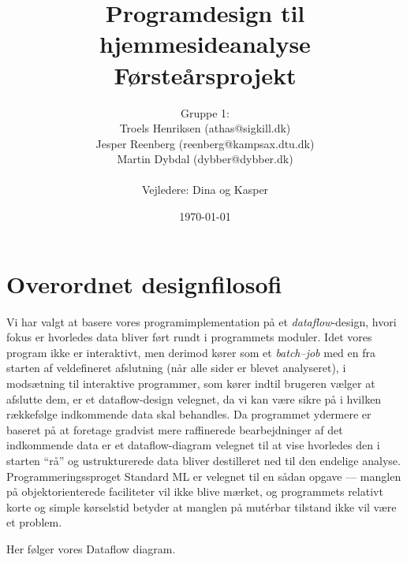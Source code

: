 \documentclass[a4paper,oneside,article, titlepage]{article}
\title{Programdesign til hjemmesideanalyse  \\
       \small{Førsteårsprojekt}}
\author
{
  Gruppe 1:\\
  Troels Henriksen (athas@sigkill.dk)\\
  Jesper Reenberg (reenberg@kampsax.dtu.dk)\\
  Martin Dybdal (dybber@dybber.dk)\\ \\
  Vejledere: Dina og Kasper
}
\date{\today}
\begin{document}
\maketitle
\tableofcontents
\newpage

\section{Overordnet designfilosofi}

Vi har valgt at basere vores programimplementation på et {\em
  dataflow}-design, hvori fokus er hvorledes data bliver ført rundt i
programmets moduler. Idet vores program ikke er interaktivt, men
derimod kører som et {\em batch--job} med en fra starten af
veldefineret afslutning (når alle sider er blevet analyseret), i
modsætning til interaktive programmer, som kører indtil brugeren
vælger at afslutte dem, er et dataflow-design velegnet, da vi kan være
sikre på i hvilken rækkefølge indkommende data skal behandles. Da
programmet ydermere er baseret på at foretage gradvist mere
raffinerede bearbejdninger af det indkommende data er et
dataflow-diagram velegnet til at vise hvorledes den i starten ``rå''
og ustrukturerede data bliver destilleret ned til den endelige
analyse. Programmeringssproget Standard ML er velegnet til en sådan
opgave --- manglen på objektorienterede faciliteter vil ikke blive
mærket, og programmets relativt korte og simple kørselstid betyder at
manglen på mutérbar tilstand ikke vil være et problem.

Her følger vores Dataflow diagram.
\end{document}
